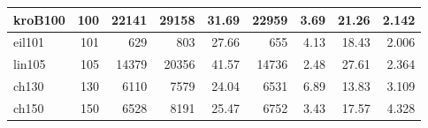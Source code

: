 \begin{table}[H]
{\begin{tabular}{|l|r|r|r|r|r|r|r|r|}
\hline
kroB100   & 100 & 22141  & 29158  & 31.69 & 22959  & 3.69 & 21.26 & 2.142 \\
\hline
eil101    & 101 & 629    & 803    & 27.66 & 655    & 4.13 & 18.43 & 2.006 \\
\hline
lin105    & 105 & 14379  & 20356  & 41.57 & 14736  & 2.48 & 27.61 & 2.364 \\
\hline
ch130     & 130 & 6110   & 7579   & 24.04 & 6531   & 6.89 & 13.83 & 3.109 \\
\hline
ch150     & 150 & 6528   & 8191   & 25.47 & 6752   & 3.43 & 17.57 & 4.328 \\
\hline
\end{tabular}%
}
\end{table}